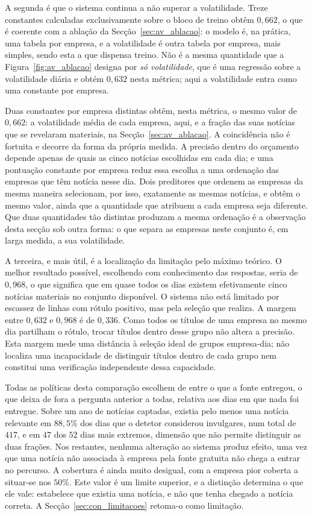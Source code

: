 A segunda é que o sistema continua a não superar a volatilidade. Treze constantes calculadas
exclusivamente sobre o bloco de treino obtêm $0{,}662$, o que é coerente com a ablação da
Secção~\ref{sec:av_ablacao}: o modelo é, na prática, uma tabela por empresa, e a volatilidade é outra
tabela por empresa, mais simples, sendo esta a que dispensa treino. Não é a mesma quantidade
que a Figura~\ref{fig:av_ablacao} designa por \emph{só volatilidade}, que é uma regressão sobre a
volatilidade diária e obtém $0{,}632$ nesta métrica; aqui a volatilidade entra como uma constante
por empresa.

Duas constantes por empresa distintas obtêm, nesta métrica, o mesmo valor de $0{,}662$: a
volatilidade média de cada empresa, aqui, e a fração das suas notícias que se revelaram materiais,
na Secção~\ref{sec:av_ablacao}. A coincidência não é fortuita e decorre da forma da própria
medida. A precisão dentro do orçamento depende apenas de quais as cinco notícias escolhidas em
cada dia; e uma pontuação constante por empresa reduz essa escolha a uma ordenação das empresas
que têm notícia nesse dia. Dois preditores que ordenem as empresas da mesma maneira selecionam,
por isso, exatamente as mesmas notícias, e obtêm o mesmo valor, ainda que a quantidade que
atribuem a cada empresa seja diferente. Que duas quantidades tão distintas produzam a mesma
ordenação é a observação desta secção sob outra forma: o que separa as empresas neste conjunto é,
em larga medida, a sua volatilidade.

A terceira, e mais útil, é a localização da limitação pelo máximo teórico. O melhor resultado
possível, escolhendo com conhecimento das respostas, seria de $0{,}968$, o que significa que em quase
todos os dias existem efetivamente cinco notícias materiais no conjunto disponível. O sistema não
está limitado por escassez de linhas com rótulo positivo, mas pela seleção que realiza. A margem
entre $0{,}632$ e $0{,}968$ é de $0{,}336$. Como todos os títulos de uma empresa no mesmo dia
partilham o rótulo, trocar títulos dentro desse grupo não altera a precisão. Esta margem mede uma
distância à seleção ideal de grupos empresa-dia; não localiza uma incapacidade de distinguir
títulos dentro de cada grupo nem constitui uma verificação independente dessa capacidade.

Todas as políticas desta comparação escolhem de entre o que a fonte entregou, o que deixa de fora a
pergunta anterior a todas, relativa aos dias em que nada foi entregue. Sobre um ano de notícias
captadas, existia pelo menos uma notícia relevante em $88{,}5\%$ dos dias que o detetor considerou
invulgares, num total de $417$, e em $47$ dos $52$ dias mais extremos, dimensão que não permite
distinguir as duas frações. Nos restantes, nenhuma alteração ao sistema produz
efeito, uma vez que uma notícia não associada à empresa pela fonte gratuita não chega a entrar no
percurso. A cobertura é ainda muito desigual, com a empresa pior coberta a situar-se nos $50\%$. Este
valor é um limite superior, e a distinção determina o que ele vale: estabelece que existia uma
notícia, e não que tenha chegado a notícia correta. A Secção~\ref{sec:con_limitacoes} retoma-o como
limitação.

